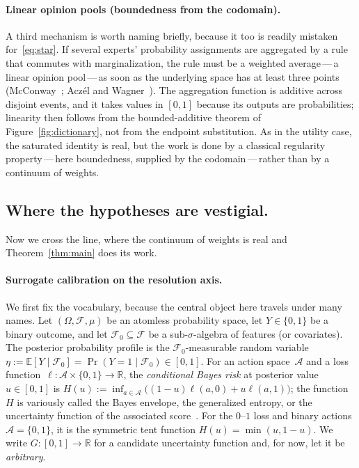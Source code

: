 \documentclass{article}
\theoremstyle{plain}
\theoremstyle{definition}
\newcommand{\R}{\mathbb{R}}
\newcommand{\E}{\mathbb{E}}
\begin{document}
\paragraph{Linear opinion pools (boundedness from the codomain).}
A third mechanism is worth naming briefly, because it too is readily
mistaken for~\eqref{eq:star}. If several experts' probability
assignments are aggregated by a rule that commutes with
marginalization, the rule must be a weighted average\,---\,a linear
opinion pool\,---\,as soon as the underlying space has at least three
points (McConway~\cite{McConway1981}; Acz\'el and
Wagner~\cite{AczelWagner1980}). The aggregation function is additive
across disjoint events, and it takes values in $[0,1]$ because its
outputs are probabilities; linearity then follows from the
bounded-additive theorem of Figure~\ref{fig:dictionary}, not from the
endpoint substitution. As in the utility case, the saturated identity
is real, but the work is done by a classical regularity
property\,---\,here boundedness, supplied by the codomain\,---\,rather
than by a continuum of weights.

\subsection{Where the hypotheses are vestigial.}
\label{ssec:vestigial}

Now we cross the line, where the continuum of weights is
real and Theorem~\ref{thm:main} does its work.

\paragraph{Surrogate calibration on the resolution axis.}
We first fix the vocabulary, because the central object here travels
under many names. Let $(\Omega,\mathcal{F},\mu)$ be an atomless
probability space, let $Y\in\{0,1\}$ be a binary outcome, and let
$\mathcal{F}_0\subseteq\mathcal{F}$ be a sub-$\sigma$-algebra of features (or covariates).
The posterior probability profile is the $\mathcal{F}_0$-measurable
random variable $\eta:=\E[Y\mid\mathcal{F}_0]=\Pr(Y=1\mid\mathcal{F}_0)\in[0,1]$.
For an action space~$\mathcal{A}$ and a loss function~$\ell\colon\mathcal{A}\times\{0,1\}\to\R$,
the \emph{conditional Bayes risk} at posterior value~$u\in[0,1]$ is
$H(u):=\inf_{a\in\mathcal{A}}\bigl((1-u)\ell(a,0)+u\ell(a,1)\bigr)$; the function $H$ is
variously called the Bayes envelope, the generalized entropy, or the
uncertainty function of the associated
score~\cite{Savage1971,DeGrootFienberg1983,GrunwaldDawid2004,GneitingRaftery2007,ReidWilliamson2011}.
For the $0$--$1$ loss and binary actions $\mathcal{A}=\{0,1\}$, it is the symmetric tent function $H(u)=\min(u,1-u)$. We write
$G\colon[0,1]\to\R$ for a candidate uncertainty function and, for now,
let it be \emph{arbitrary}.
\end{document}
